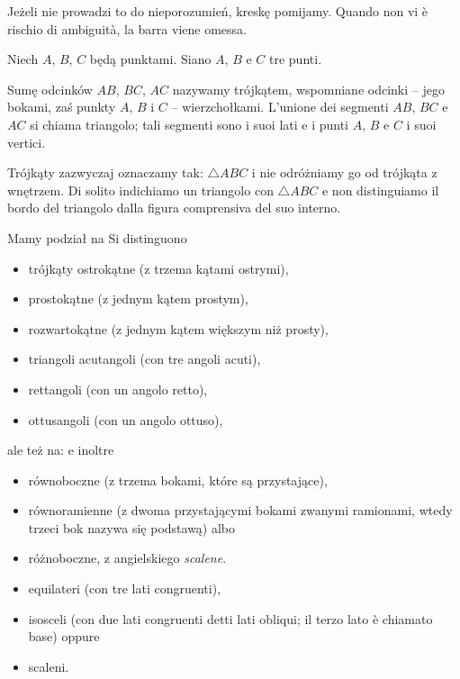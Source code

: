 Jeżeli nie prowadzi to do nieporozumień, kreskę pomijamy. %
Quando non vi è rischio di ambiguità, la barra viene omessa. %

\begin{definition}
[trójkąt] %
[triangolo] %
    Niech $A$, $B$, $C$ będą punktami. %
    Siano $A$, $B$ e $C$ tre punti. %

    Sumę odcinków $AB$, $BC$, $AC$ nazywamy trójkątem, wspomniane odcinki -- jego bokami, zaś punkty $A$, $B$ i $C$ -- wierzchołkami. %
    L'unione dei segmenti $AB$, $BC$ e $AC$ si chiama triangolo; tali segmenti sono i suoi lati e i punti $A$, $B$ e $C$ i suoi vertici. %

\end{definition} %

Trójkąty zazwyczaj oznaczamy tak: $\triangle ABC$ i nie odróżniamy go od trójkąta z wnętrzem. %
Di solito indichiamo un triangolo con $\triangle ABC$ e non distinguiamo il bordo del triangolo dalla figura comprensiva del suo interno. %

Mamy podział na %
Si distinguono %
\begin{itemize}
    \item trójkąty ostrokątne (z trzema kątami ostrymi), %
    \item prostokątne (z jednym kątem prostym), %
    \item rozwartokątne (z jednym kątem większym niż prosty), %
    \item triangoli acutangoli (con tre angoli acuti), %
    \item rettangoli (con un angolo retto), %
    \item ottusangoli (con un angolo ottuso), %
\end{itemize}

ale też na: %
e inoltre %

\begin{itemize}
\item równoboczne (z trzema bokami, które są przystające), %
\item równoramienne (z dwoma przystającymi bokami zwanymi ramionami, wtedy trzeci bok nazywa się podstawą) albo %
\item różnoboczne, z angielskiego \emph{scalene}. %
\item equilateri (con tre lati congruenti), %
\item isosceli (con due lati congruenti detti lati obliqui; il terzo lato è chiamato base) oppure %
\item scaleni. %
\end{itemize}

